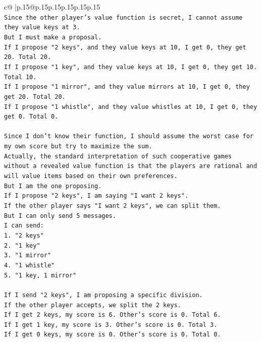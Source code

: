 \documentclass{article}
\begin{document}
{\begin{supertabular}{c@{$\;$}|p{.15\linewidth}@{}p{.15\linewidth}p{.15\linewidth}p{.15\linewidth}p{.15\linewidth}p{.15\linewidth}}
{{{\\ 
\texttt{Since the other player's value function is secret, I cannot assume they value keys at 3.} \\
\texttt{But I must make a proposal.} \\
\texttt{If I propose "2 keys", and they value keys at 10, I get 0, they get 20. Total 20.} \\
\texttt{If I propose "1 key", and they value keys at 10, I get 0, they get 10. Total 10.} \\
\texttt{If I propose "1 mirror", and they value mirrors at 10, I get 0, they get 20. Total 20.} \\
\texttt{If I propose "1 whistle", and they value whistles at 10, I get 0, they get 0. Total 0.} \\
\\ 
\texttt{Since I don't know their function, I should assume the worst case for my own score but try to maximize the sum.} \\
\texttt{Actually, the standard interpretation of such cooperative games without a revealed value function is that the players are rational and will value items based on their own preferences.} \\
\texttt{But I am the one proposing.} \\
\texttt{If I propose "2 keys", I am saying "I want 2 keys".} \\
\texttt{If the other player says "I want 2 keys", we can split them.} \\
\texttt{But I can only send 5 messages.} \\
\texttt{I can send:} \\
\texttt{1. "2 keys"} \\
\texttt{2. "1 key"} \\
\texttt{3. "1 mirror"} \\
\texttt{4. "1 whistle"} \\
\texttt{5. "1 key, 1 mirror"} \\
\\ 
\texttt{If I send "2 keys", I am proposing a specific division.} \\
\texttt{If the other player accepts, we split the 2 keys.} \\
\texttt{If I get 2 keys, my score is 6. Other's score is 0. Total 6.} \\
\texttt{If I get 1 key, my score is 3. Other's score is 0. Total 3.} \\
\texttt{If I get 0 keys, my score is 0. Other's score is 0. Total 0.} \\
}}}
\end{supertabular}}
\end{document}
